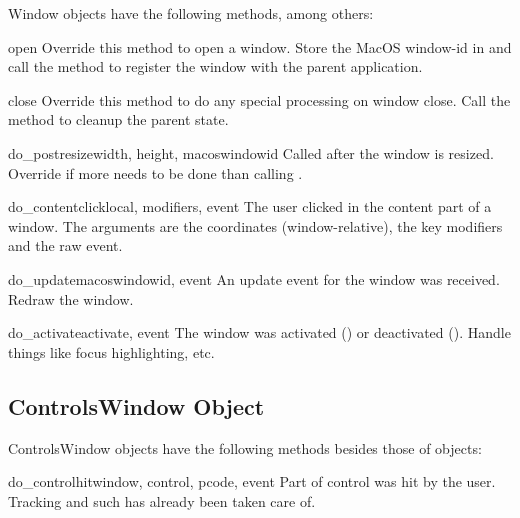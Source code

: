 Window objects have the following methods, among others:


\begin{methoddesc}[Window]{open}{}
Override this method to open a window. Store the MacOS window-id in
 and call the  method to
register the window with the parent application.
\end{methoddesc}

\begin{methoddesc}[Window]{close}{}
Override this method to do any special processing on window
close. Call the  method to cleanup the parent
state.
\end{methoddesc}

\begin{methoddesc}[Window]{do_postresize}{width, height, macoswindowid}
Called after the window is resized. Override if more needs to be done
than calling .
\end{methoddesc}

\begin{methoddesc}[Window]{do_contentclick}{local, modifiers, event}
The user clicked in the content part of a window. The arguments are
the coordinates (window-relative), the key modifiers and the raw
event.
\end{methoddesc}

\begin{methoddesc}[Window]{do_update}{macoswindowid, event}
An update event for the window was received. Redraw the window.
\end{methoddesc}

\begin{methoddesc}{do_activate}{activate, event}
The window was activated () or deactivated
(). Handle things like focus highlighting,
etc.
\end{methoddesc}


\subsection{ControlsWindow Object \label{controlswindow-object}}

ControlsWindow objects have the following methods besides those of
 objects:


\begin{methoddesc}[ControlsWindow]{do_controlhit}{window, control,
                                                  pcode, event}
Part  of control  was hit by the
user. Tracking and such has already been taken care of.
\end{methoddesc}


